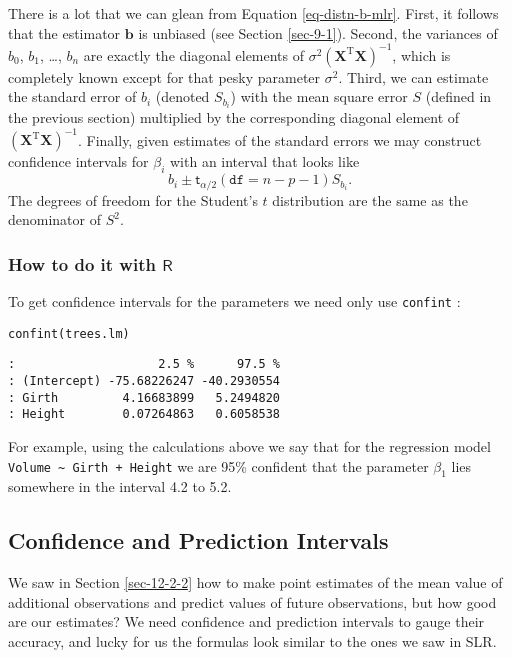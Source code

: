 There is a lot that we can glean from Equation \eqref{eq-distn-b-mlr}. First,
it follows that the estimator \(\mathbf{b}\) is unbiased (see Section
\ref{sec-9-1}). Second, the variances of \(b_{0}\), \(b_{1}\),
\ldots{}, \(b_{n}\) are exactly the diagonal elements of
\(\sigma^{2}\left(\mathbf{X}^{\mathrm{T}}\mathbf{X}\right)^{-1}\),
which is completely known except for that pesky parameter
\(\sigma^{2}\). Third, we can estimate the standard error of \(b_{i}\)
(denoted \(S_{b_{i}}\)) with the mean square error \(S\) (defined in
the previous section) multiplied by the corresponding diagonal element
of \(\left(\mathbf{X}^{\mathrm{T}}\mathbf{X}\right)^{-1}\). Finally,
given estimates of the standard errors we may construct confidence
intervals for \(\beta_{i}\) with an interval that looks like
\begin{equation}
b_{i}\pm\mathsf{t}_{\alpha/2}(\mathtt{df}=n-p-1)S_{b_{i}}.
\end{equation}
The degrees of freedom for the Student's \(t\) distribution
are the same as the denominator of \(S^{2}\).

\subsubsection{How to do it with \(\mathsf{R}\)}
\label{sec-12-2-4-1}

To get confidence intervals for the parameters we need only use
\texttt{confint} :

\begin{verbatim}
confint(trees.lm)
\end{verbatim}

\begin{verbatim}
:                    2.5 %      97.5 %
: (Intercept) -75.68226247 -40.2930554
: Girth         4.16683899   5.2494820
: Height        0.07264863   0.6058538
\end{verbatim}

For example, using the calculations above we say that for the
regression model \texttt{Volume \textasciitilde{} Girth + Height} we are 95\% confident that
the parameter \(\beta_{1}\) lies somewhere in the interval
4.2 to 5.2.

\subsection{Confidence and Prediction Intervals}
\label{sec-12-2-5}

We saw in Section \ref{sec-12-2-2} how to make point estimates
of the mean value of additional observations and predict values of
future observations, but how good are our estimates? We need
confidence and prediction intervals to gauge their accuracy, and lucky
for us the formulas look similar to the ones we saw in SLR.

